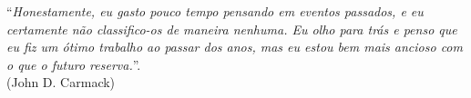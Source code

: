 \thispagestyle{empty}
\begin{center}
%
\end{center}
\vspace{18cm}

\begin{flushright}
``\emph{Honestamente, eu gasto pouco tempo pensando em eventos passados, e eu
certamente não classifico-os de maneira nenhuma. Eu olho para trás e
penso que eu fiz um ótimo trabalho ao passar dos anos, mas eu estou
bem mais ancioso com o que o futuro reserva.}''.  \\ (John D. Carmack)
\end{flushright}
